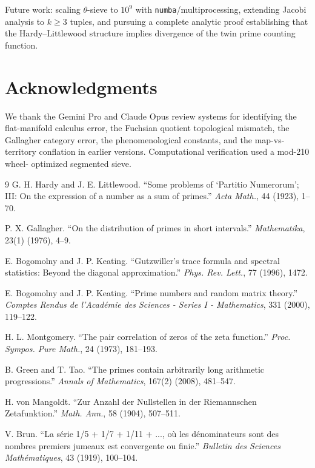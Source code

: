 \documentclass[12pt]{article}
\begin{document}
Future work: scaling $\theta$-sieve to $10^9$ with \texttt{numba}/multiprocessing,
extending Jacobi analysis to $k \geq 3$ tuples, and pursuing a complete analytic
proof establishing that the Hardy--Littlewood structure implies divergence of the
twin prime counting function.

\section*{Acknowledgments}

We thank the Gemini Pro and Claude Opus review systems for identifying the
flat-manifold calculus error, the Fuchsian quotient topological mismatch, the
Gallagher category error, the phenomenological constants, and the map-vs-territory
conflation in earlier versions. Computational verification used a mod-210 wheel-
optimized segmented sieve.

\begin{thebibliography}{9}
G. H. Hardy and J. E. Littlewood.
``Some problems of `Partitio Numerorum'; III: On the expression of a number
as a sum of primes.''
\emph{Acta Math.}, 44 (1923), 1--70.

P. X. Gallagher.
``On the distribution of primes in short intervals.''
\emph{Mathematika}, 23(1) (1976), 4--9.

E. Bogomolny and J. P. Keating.
``Gutzwiller's trace formula and spectral statistics: Beyond the diagonal
approximation.''
\emph{Phys. Rev. Lett.}, 77 (1996), 1472.

E. Bogomolny and J. P. Keating.
``Prime numbers and random matrix theory.''
\emph{Comptes Rendus de l'Académie des Sciences - Series I - Mathematics}, 331 (2000), 119--122.

H. L. Montgomery.
``The pair correlation of zeros of the zeta function.''
\emph{Proc. Sympos. Pure Math.}, 24 (1973), 181--193.

B. Green and T. Tao.
``The primes contain arbitrarily long arithmetic progressions.''
\emph{Annals of Mathematics}, 167(2) (2008), 481--547.

H. von Mangoldt.
``Zur Anzahl der Nullstellen in der Riemannschen Zetafunktion.''
\emph{Math. Ann.}, 58 (1904), 507--511.

V. Brun.
``La série 1/5 + 1/7 + 1/11 + ..., où les dénominateurs sont des nombres
premiers jumeaux est convergente ou finie.''
\emph{Bulletin des Sciences Mathématiques}, 43 (1919), 100--104.
\end{thebibliography}
\end{document}
